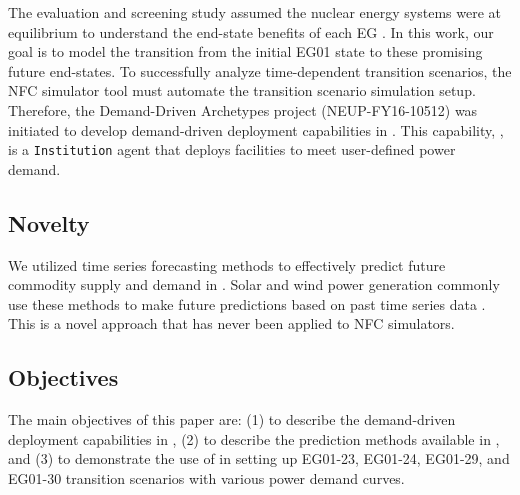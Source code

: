 The evaluation and screening study assumed
the nuclear energy systems were at equilibrium to understand 
the end-state benefits of each \gls{EG} \cite{feng_standardized_2016}. 
In this work, our goal is to model the transition from the initial EG01
state to these promising future end-states. 
To successfully analyze time-dependent transition
scenarios, the \gls{NFC} simulator tool must 
automate the transition scenario simulation setup. 
Therefore, the Demand-Driven \Cycamore Archetypes project
(NEUP-FY16-10512) was initiated to develop 
demand-driven deployment capabilities in \Cyclus. 
This capability, \deploy, is a \Cyclus \texttt{Institution}
agent that deploys facilities to meet user-defined power demand. 

\subsection{Novelty}
We utilized time series forecasting methods to effectively predict 
future commodity supply and demand in \deploy. 
Solar and wind power generation commonly use these methods
to make future predictions based on past time series data
\cite{reikard_predicting_2009,diagne_review_2013,soman_review_2010,taylor_wind_2009}. 
This is a novel approach that has never been applied to 
\gls{NFC} simulators. 

\subsection{Objectives}
\label{sec:obj}
The main objectives of this paper are: 
(1) to describe the demand-driven deployment capabilities in 
\Cyclus, 
(2) to describe the prediction methods available in 
\deploy, and
(3) to demonstrate the use of \deploy in setting up 
EG01-23, EG01-24, EG01-29, and EG01-30 transition scenarios 
with various power demand curves.